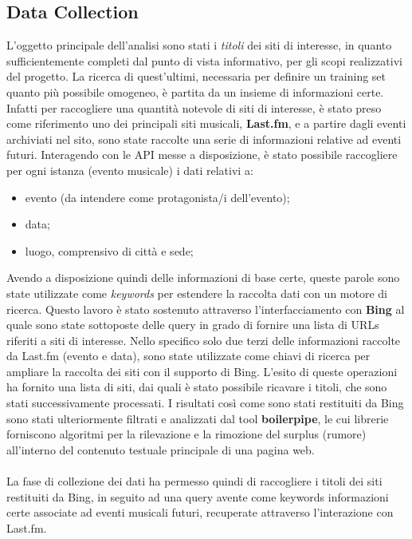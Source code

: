 \documentclass[a4paper]{report}
\begin{document}
\subsection{Data Collection}
L'oggetto principale dell'analisi sono stati i \textit{titoli} dei siti di interesse, in quanto sufficientemente completi dal punto di vista informativo, per gli scopi realizzativi del progetto. La ricerca di quest'ultimi, necessaria per definire un training set quanto più possibile omogeneo, è partita da un insieme di informazioni certe. Infatti per raccogliere una quantità notevole di siti di interesse, è stato preso come riferimento uno dei principali siti musicali, \textbf{Last.fm}\cite{6}, e a partire dagli eventi archiviati nel sito, sono state raccolte una serie di informazioni relative ad eventi futuri. Interagendo con le API messe a disposizione, è stato possibile raccogliere per ogni istanza (evento musicale) i dati relativi a:
\begin{itemize}
\item evento (da intendere come protagonista/i dell'evento);
\item data;
\item luogo, comprensivo di città e sede;
\end{itemize}
Avendo a disposizione quindi delle informazioni di base certe, queste parole sono state utilizzate come \textit{keywords} per estendere la raccolta dati con un motore di ricerca. Questo lavoro è stato sostenuto attraverso l'interfacciamento con \textbf{Bing} al quale sono state sottoposte delle query in grado di fornire una lista di URLs riferiti a siti di interesse. Nello specifico solo due terzi delle informazioni raccolte da Last.fm (evento e data), sono state utilizzate come chiavi di ricerca per ampliare la raccolta dei siti con il supporto di Bing. L'esito di queste operazioni ha fornito una lista di siti, dai quali è stato possibile ricavare i titoli, che sono stati successivamente processati. I risultati così come sono stati restituiti da Bing sono stati ulteriormente filtrati e analizzati dal tool \textbf{boilerpipe}\cite{7}, le cui librerie forniscono algoritmi per la rilevazione e la rimozione del surplus (rumore) all'interno del contenuto testuale principale di una pagina web. \\
\\
La fase di collezione dei dati ha permesso quindi di raccogliere i titoli dei siti restituiti da Bing, in seguito ad una query avente come keywords informazioni certe associate ad eventi musicali futuri, recuperate attraverso l'interazione con Last.fm.
\end{document}
